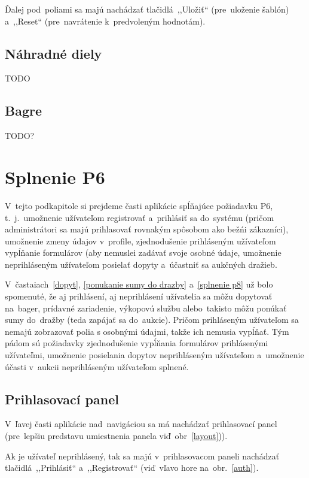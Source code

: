 Ďalej pod~poliami sa majú nachádzať tlačidlá~,,Uložiť`` (pre~uloženie šablón) a~,,Reset`` (pre~navrátenie k~predvoleným hodnotám).

\subsection{Náhradné diely}

TODO

\subsection{Bagre}

TODO?

\section{Splnenie P6}
\label{splnenie p6}

V~tejto podkapitole si prejdeme časti aplikácie spĺňajúce požiadavku P6, t.~j.~umožnenie užívateľom registrovať a~prihlásiť sa do~systému (pričom administrátori sa majú prihlasovať rovnakým spôsobom ako bežńi zákazníci), umožnenie zmeny údajov v~profile, zjednodušenie prihláseným užívateľom vypĺňanie formulárov (aby nemuslei zadávať svoje osobné údaje, umožnenie neprihláseným užívateľom posielať dopyty a~účastniť sa aukčných dražieb.

V~častaiach~\ref{dopyt}, \ref{ponukanie sumy do drazby} a~\ref{splnenie p8} už bolo spomenuté, že aj prihlásení, aj neprihlásení užívatelia sa môžu dopytovať na~bager, prídavné zariadenie, výkopovú službu alebo~takisto môžu ponúkať sumy do~dražby (teda zapájať sa do~aukcie). Pričom prihláseným užívateľom sa nemajú zobrazovať polia s osobnými údajmi, takže ich nemusia vypĺňať. Tým pádom sú požiadavky zjednodušenie vypĺňania formulárov prihlásenými užívateľmi, umožnenie posielania dopytov neprihláseným užívateľom a~umožnenie účasti v~aukcii neprihláseným užívateľom splnené.

\subsection{Prihlasovací panel}

V~ľavej časti aplikácie nad~navigáciou sa má nachádzať prihlasovací panel (pre~lepšiu predstavu umiestnenia panela viď~obr~\ref{layout})).

Ak je užívateľ neprihlásený, tak sa majú v~prihlasovacom paneli nachádzať tlačidlá~,,Prihlásiť`` a~,,Registrovať`` (viď~vľavo hore na~obr.~\ref{auth}).

